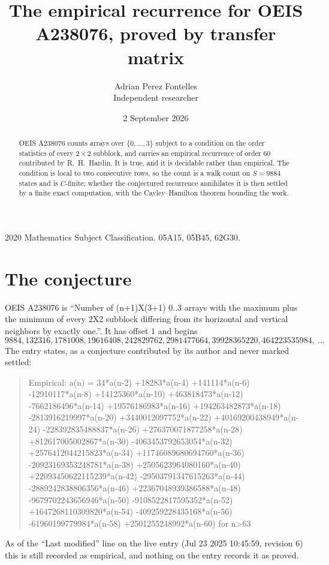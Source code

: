 \documentclass[11pt,a4paper]{article}
\title{The empirical recurrence for OEIS A238076, proved by transfer matrix}
\author{Adrian Perez Fontelles\\ \small Independent researcher}
\date{2 September 2026}
\theoremstyle{plain}
\theoremstyle{definition}
\begin{document}
\maketitle

\begin{abstract}
OEIS A238076 counts arrays over $\{0,\dots,3\}$ subject to a condition on the order
statistics of every $2\times2$ subblock, and carries an empirical recurrence of order
$60$ contributed by R.~H.~Hardin. It is true, and it is decidable rather than empirical.
The condition is local to two consecutive rows, so the count is a walk count on $S=9884$
states and is $C$-finite; whether the conjectured recurrence annihilates it is then settled by
a finite exact computation, with the Cayley--Hamilton theorem bounding the work.
\end{abstract}

\noindent\small 2020 Mathematics Subject Classification. 05A15, 05B45, 62G30.\normalsize

\section{The conjecture}

OEIS A238076 is ``Number of (n+1)X(3+1) 0..3 arrays with the maximum plus the minimum of every 2X2 subblock differing from its horizontal and vertical neighbors by exactly one.''. It has offset $1$ and begins
\[
9884, 132316, 1781008, 19616408, 242829762, 2981477664, 39928365220, 464223535984,\ \dots
\]
The entry states, as a conjecture contributed by its author and never marked settled:
\begin{quote}
Empirical: a(n) = 34*a(n-2) +18283*a(n-4) +141114*a(n-6) -12910117*a(n-8) +14125360*a(n-10) +463818473*a(n-12) -7662186496*a(n-14) +19576186983*a(n-16) +194263482873*a(n-18) -2813916219997*a(n-20) +3440012097752*a(n-22) +40169200438949*a(n-24) -228392835488837*a(n-26) +276370071877258*a(n-28) +812617005002867*a(n-30) -4063453792653054*a(n-32) +2576412044215823*a(n-34) +11746089680694760*a(n-36) -20923169353248781*a(n-38) +2505623964080160*a(n-40) +22093450622115239*a(n-42) -29503791347615263*a(n-44) -2889242838806356*a(n-46) +22367048939386588*a(n-48) -9679702243656946*a(n-50) -9108522817595352*a(n-52) +1647268110309820*a(n-54) -409259228435168*a(n-56) -61960199779984*a(n-58) +2501255248992*a(n-60) for n>63
\end{quote}
As of the ``Last modified'' line on the live entry (Jul 23 2025 10:45:59, revision 6) this is still
recorded as empirical, and nothing on the entry records it as proved.
\end{document}
